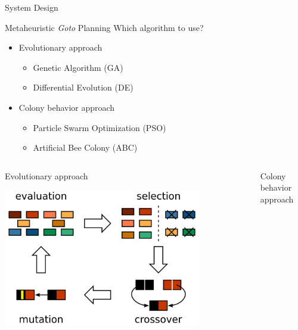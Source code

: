 \documentclass[9pt]{beamer}
\begin{document}
\begin{frame}{System Design}
    \begin{block}{Metaheuristic \textit{Goto} Planning}
        Which algorithm to use? 
	    \begin{itemize}
	        \item Evolutionary approach
	        \begin{itemize}
	            \item Genetic Algorithm (GA)
	            \item Differential Evolution (DE)
	        \end{itemize}
	        \item Colony behavior approach
	        \begin{itemize}
	            \item Particle Swarm Optimization (PSO)
	            \item Artificial Bee Colony (ABC)
	        \end{itemize}
        \end{itemize}
    \end{block}
    \begin{columns}
         \begin{column}{0.5\textwidth}
             \begin{block}{Evolutionary approach}   
                 \begin{center}
                     \includegraphics[width=0.8\textwidth,trim={0cm 0cm 0cm 0cm},clip]{img/ga.png}
                 \end{center}
             \end{block} 
        \end{column}
        \begin{column}{0.5\textwidth}
             \begin{block}{Colony behavior approach}   

\end{block}
\end{column}
\end{columns}
\end{frame}
\end{document}
